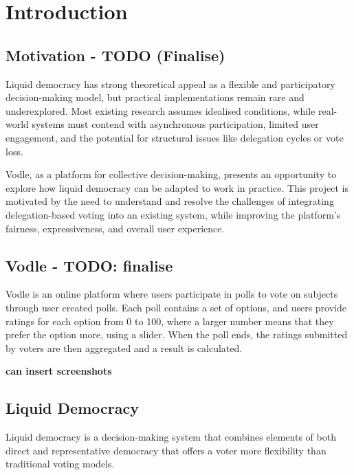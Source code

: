 \chapter{Introduction}\label{ch:introduction}

\section{Motivation - TODO (Finalise)}
Liquid democracy has strong theoretical appeal as a flexible and participatory decision-making model, but practical implementations remain rare and underexplored. Most existing research assumes idealised conditions, while real-world systems must contend with asynchronous participation, limited user engagement, and the potential for structural issues like delegation cycles or vote loss.

Vodle, as a platform for collective decision-making, presents an opportunity to explore how liquid democracy can be adapted to work in practice. This project is motivated by the need to understand and resolve the challenges of integrating delegation-based voting into an existing system, while improving the platform's fairness, expressiveness, and overall user experience.

\section{Vodle - TODO: finalise}
Vodle is an online platform where users participate in polls to vote on subjects through user created polls. Each poll contains a set of options, and users provide ratings for each option from 0 to 100, where a larger number means that they prefer the option more, using a slider. When the poll ends, the ratings submitted by voters are then aggregated and a result is calculated.

\textbf{can insert screenshots}

\section{Liquid Democracy}
Liquid democracy is a decision-making system that combines elements of both direct and representative democracy that offers a voter more flexibility than traditional voting models.

